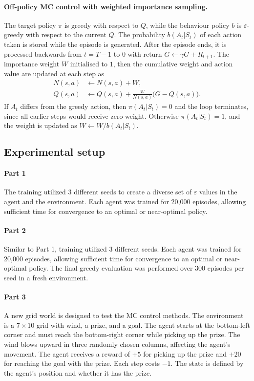 \documentclass{article}
\begin{document}
\paragraph{Off-policy MC control with weighted importance sampling.}
The target policy $\pi$ is greedy with respect to $Q$, while the behaviour
policy $b$ is $\varepsilon$-greedy with respect to the current $Q$. The
probability $b(A_t|S_t)$ of each action taken is stored while the episode is
generated. After the episode ends, it is processed backwards from $t=T-1$ to $0$
with return $G\leftarrow \gamma G + R_{t+1}$. The importance weight $W$
initialised to $1$, then the cumulative weight and action value are updated at
each step as
\begin{align*}
N(s,a) &\leftarrow N(s,a) + W,\\
Q(s,a) &\leftarrow Q(s,a) + \frac{W}{N(s,a)}\bigl(G - Q(s,a)\bigr).
\end{align*}
If $A_t$ differs from the greedy action, then $\pi(A_t|S_t)=0$ and the loop
terminates, since all earlier steps would receive zero weight. Otherwise
$\pi(A_t|S_t)=1$, and the weight is updated as $W\leftarrow W/b(A_t|S_t)$.

\subsection{Experimental setup}
\paragraph{Part 1}
The training utilized 3 different seeds to create a diverse set of $\varepsilon$
values in the agent and the environment. Each agent was trained for 20{,}000
episodes, allowing sufficient time for convergence to an optimal or near-optimal
policy. 
\paragraph{Part 2}
Similar to Part 1, training utilized 3 different seeds. Each agent was trained
for 20{,}000 episodes, allowing sufficient time for convergence to an optimal or
near-optimal policy. The final greedy evaluation was performed over 300 episodes
per seed in a fresh environment.
\paragraph{Part 3}
A new grid world is designed to test the MC control methods. The environment is
a $7\times10$ grid with wind, a prize, and a goal. The agent starts at the
bottom-left corner and must reach the bottom-right corner while picking up the
prize. The wind blows upward in three randomly chosen columns, affecting the
agent's movement. The agent receives a reward of $+5$ for picking up the prize
and $+20$ for reaching the goal with the prize. Each step costs $-1$. The state
is defined by the agent's position and whether it has the prize.
\end{document}
